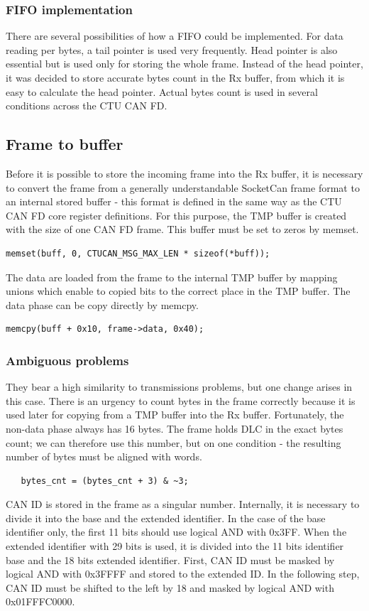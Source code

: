 \documentclass{ctuthesis}
\begin{document}
  \subsubsection{FIFO implementation}
   There are several possibilities of how a FIFO could be implemented. For data reading per bytes, a tail pointer is used very frequently. Head pointer is also essential but is used only for storing the whole frame. Instead of the head pointer, it was decided to store accurate bytes count in the Rx buffer, from which it is easy to calculate the head pointer. Actual bytes count is used in several conditions across the CTU CAN FD.
 
 \subsection{Frame to buffer}
  Before it is possible to store the incoming frame into the Rx buffer, it is necessary to convert the frame from a generally understandable SocketCan frame format to an internal stored buffer - this format is defined in the same way as the CTU CAN FD core register definitions. For this purpose, the TMP buffer is created with the size of one CAN FD frame. This buffer must be set to zeros by memset.
  \begin{verbatim}memset(buff, 0, CTUCAN_MSG_MAX_LEN * sizeof(*buff));\end{verbatim}
  The data are loaded from the frame to the internal TMP buffer by mapping unions which enable to copied bits to the correct place in the TMP buffer. The data phase can be copy directly by memcpy.
  \begin{verbatim}memcpy(buff + 0x10, frame->data, 0x40);\end{verbatim}
 
  \subsubsection{Ambiguous problems}
   They bear a high similarity to transmissions problems, but one change arises in this case. There is an urgency to count bytes in the frame correctly because it is used later for copying from a TMP buffer into the Rx buffer. Fortunately, the non-data phase always has 16 bytes. The frame holds DLC in the exact bytes count; we can therefore use this number, but on one condition - the resulting number of bytes must be aligned with words.
   \begin{verbatim}   bytes_cnt = (bytes_cnt + 3) & ~3;\end{verbatim}
   CAN ID is stored in the frame as a singular number. Internally, it is necessary to divide it into the base and the extended identifier. In the case of the base identifier only, the first 11 bits should use logical AND with 0x3FF. When the extended identifier with 29 bits is used, it is divided into the 11 bits identifier base and the 18 bits extended identifier. First, CAN ID must be masked by logical AND with 0x3FFFF and stored to the extended ID. In the following step, CAN ID must be shifted to the left by 18 and masked by logical AND with 0x01FFFC0000.
  
\end{document}
